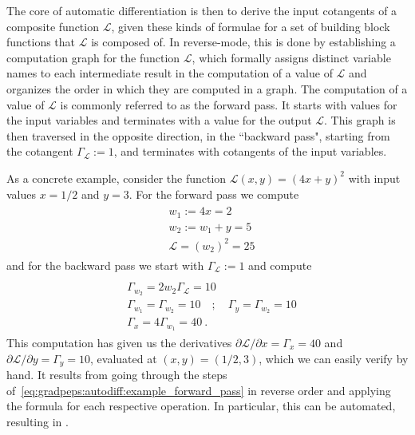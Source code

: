 The core of automatic differentiation is then to derive the input cotangents of a composite function $\mathcal{L}$, given these kinds of formulae for a set of building block functions that $\mathcal{L}$ is composed of.
%
In reverse-mode, this is done by establishing a computation graph for the function $\mathcal{L}$, which formally assigns distinct variable names to each intermediate result in the computation of a value of $\mathcal{L}$ and organizes the order in which they are computed in a graph.
%
The computation of a value of $\mathcal{L}$ is commonly referred to as the forward pass.
%
It starts with values for the input variables and terminates with a value for the output $\mathcal{L}$.
%
This graph is then traversed in the opposite direction, in the ``backward pass", starting from the cotangent $\Gamma_{\mathcal{L}} := 1$, and terminates with cotangents of the input variables.



As a concrete example, consider the function $\mathcal{L}(x, y) = (4x + y)^2$ with input values $x = 1/2$ and $y=3$.
%
For the forward pass we compute
\begin{align}
\begin{split}
    \label{eq:gradpeps:autodiff:example_forward_pass}
    &w_1 := 4x = 2
    \\
    &w_2 := w_1 + y = 5
    \\
    &\mathcal{L} = (w_2)^2 = 25
\end{split}
\end{align}
and for the backward pass we start with $\Gamma_{\mathcal{L}} := 1$ and compute
\begin{align}
\begin{split}
    \label{eq:gradpeps:autodiff:example_backward_pass}
    \\
    &\Gamma_{w_2} = 2 w_2 \Gamma_{\mathcal{L}} = 10
    \\
    &\Gamma_{w_1} = \Gamma_{w_2} = 10 \quad ; \quad  \Gamma_{y} = \Gamma_{w_2} = 10
    \\
    &\Gamma_{x} = 4 \Gamma_{w_1} = 40
    ~.
\end{split}
\end{align}
%
This computation has given us the derivatives $\partial\mathcal{L}/\partial x = \Gamma_{x} = 40$ and $\partial\mathcal{L}/\partial y = \Gamma_{y} = 10$, evaluated at $(x,y) = (1/2, 3)$, which we can easily verify by hand.
%
It results from going through the steps of~\eqref{eq:gradpeps:autodiff:example_forward_pass} in reverse order and applying the  formula for each respective operation.
%
In particular, this can be automated, resulting in .


